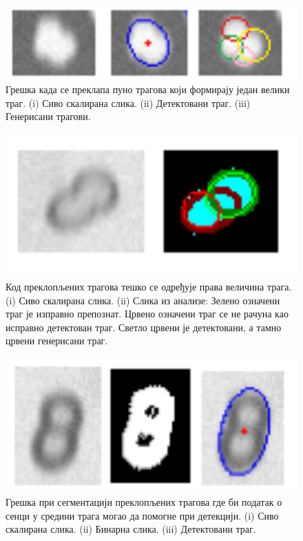 \documentclass[12pt,a4paper,serbian,oneside]{book}
\begin{document}
\begin{figure}[H]
\begin{center}
\includegraphics[width=150mm]{images/multi.png}
\end{center}
\caption{Грешка када се преклапа пуно трагова који формирају један велики траг. (i) Сиво скалирана слика. (ii) Детектовани траг.  (iii) Генерисани трагови. }
\label{fig:multi}
\end{figure}

\begin{figure}[H]
\begin{center}
\includegraphics[width=150mm]{images/small.png}
\end{center}
\caption{Код преклопљених трагова тешко се одређује права величина трага. (i)  Сиво скалирана слика. (ii) Слика из анализе: Зелено означени траг је изправно препознат. Црвено означени траг се не рачуна као исправно детектован траг. Светло црвени је детектовани, а тамно црвени генерисани траг. }
\label{fig:small}
\end{figure}

\begin{figure}[H]
\begin{center}
\includegraphics[width=150mm]{images/shadow.png}
\end{center}
\caption{Грешка при сегментацији преклопљених трагова где би податак о сенци у средини трага могао да помогне при детекцији. (i) Сиво скалирана слика. (ii) Бинарна слика. (iii) Детектовани траг. }
\label{fig:shadow}
\end{figure}
\end{document}
